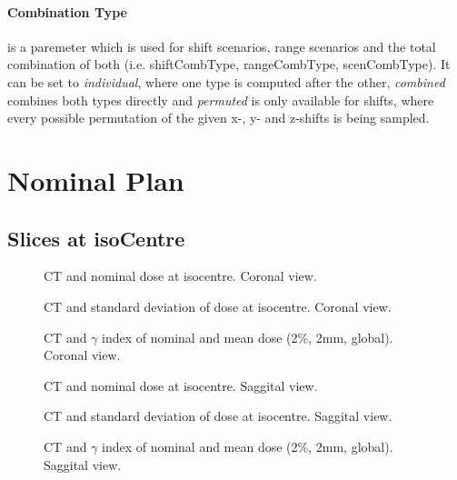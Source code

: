 \documentclass[a4paper]{scrartcl}
\begin{document}
\paragraph{Combination Type} is a paremeter which is used for shift scenarios, range scenarios and the total combination of both (i.e. shiftCombType, rangeCombType, scenCombType).
It can be set to \textit{individual}, where one type is computed after the other, \textit{combined} combines both types directly and \textit{permuted} is only available for shifts, where every possible permutation of the given x-, y- and z-shifts is being sampled.






\FloatBarrier
\newpage

\section{Nominal Plan}
\subsection{Slices at isoCentre}
\begin{figure}[!b]
  \centering
  
  \caption{CT and nominal dose at isocentre. Coronal view.}
\end{figure}

\begin{figure}[!b]
  \centering
  
  \caption{CT and standard deviation of dose at isocentre. Coronal view.}
\end{figure}

\begin{figure}[!b]
  \centering
  
  \caption{CT and $\gamma$ index of nominal and mean dose (2\%, 2mm, global). Coronal view.}
\end{figure}

\begin{figure}[!b]
  \centering
  
  \caption{CT and nominal dose at isocentre. Saggital view.}
\end{figure}

\begin{figure}[!b]
  \centering
  
  \caption{CT and standard deviation of dose at isocentre. Saggital view.}
\end{figure}

\begin{figure}[!b]
  \centering
  
  \caption{CT and $\gamma$ index of nominal and mean dose (2\%, 2mm, global). Saggital view.}
\end{figure}
\end{document}
